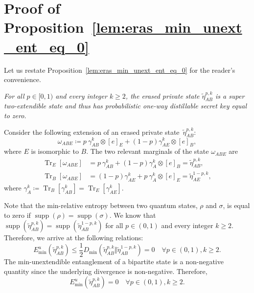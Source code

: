 \documentclass[twocolumn,letterpaper, dvipsnames,allowtoday, accepted = 2025-12-31]{quantumarticle}
\begin{document}
\section{Proof of Proposition~\ref{lem:eras_min_unext_ent_eq_0}}

\label{app:eras_min_unext_ent_eq_0}

Let us restate Proposition~\ref{lem:eras_min_unext_ent_eq_0} for the reader's convenience.

\emph{For all $p \in [0,1)$ and every integer $k \geq 2$, the erased private state $\widetilde{\eta}^{p,k}_{AB}$ is a super two-extendible state and thus has probabilistic one-way distillable secret key equal to zero.}

\medskip

    Consider the following extension of an erased private state~$\widetilde{\eta}^{p,k}_{AB}$:
    \begin{equation}
        \omega_{ABE} \coloneqq p~\gamma^{k}_{AB}\otimes[e]_{E} + (1-p)\gamma^{k}_{AE}\otimes[e]_{B},
    \end{equation}
    where $E$ is isomorphic to $B$. The two relevant marginals of the state $\omega_{ABE}$ are 
    \begin{align}
        \operatorname{Tr}_{E}\!\left[\omega_{ABE}\right] &= p~\gamma^k_{AB} + (1-p)\gamma^{k}_{A}\otimes [e]_{B} = \widetilde{\eta}^{p,k}_{AB},\\
        \operatorname{Tr}_{B}\!\left[\omega_{ABE}\right] &= (1-p)\gamma^k_{AE} + p~\gamma^{k}_{A}\otimes [e]_{E} = \widetilde{\eta}^{1-p,k}_{AE},
    \end{align}
    where $\gamma^k_A \coloneqq \operatorname{Tr}_B\!\left[\gamma^k_{AB}\right] = \operatorname{Tr}_E\!\left[\gamma^k_{AE}\right]$.

    Note that the min-relative entropy between two quantum states, $\rho$ and $\sigma$, is equal to zero if $\operatorname{supp}(\rho) = \operatorname{supp}(\sigma)$. We know that $\operatorname{supp}(\widetilde{\eta}^{p,k}_{AB}) = \operatorname{supp}(\widetilde{\eta}^{1-p,k}_{AB})$ for all $p \in (0,1)$ and every integer $k\ge 2$. Therefore, we arrive at the following relations:
    \begin{equation}
        E^u_{\min}\!\left(\widetilde{\eta}^{p,k}_{AB}\right) \le \frac{1}{2}D_{\min}\!\left(\widetilde{\eta}^{p,k}_{AB}\Big\Vert \widetilde{\eta}^{1-p,k}_{AB}\right) = 0 \quad \forall p\in (0,1), k\ge 2.
    \end{equation}
    The min-unextendible entanglement of a bipartite state is a non-negative quantity since the underlying divergence is non-negative. Therefore,
    \begin{equation}
        E^u_{\min}\!\left(\widetilde{\eta}^{p,k}_{AB}\right) = 0 \quad \forall p\in (0,1), k\ge 2.
    \end{equation}
\end{document}
